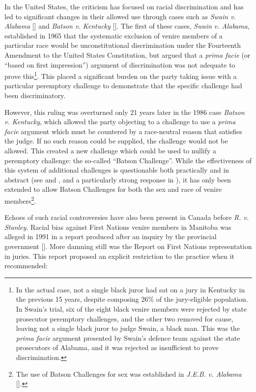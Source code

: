 In the United States, the criticism has focused on racial discrimination and has led to significant changes in their allowed use
through cases such as \textit{Swain v. Alabama} [\cite{swainvalabama}] and \textit{Batson v. Kentucky}
[\cite{batsonvkentucky}]. The first of these cases, \textit{Swain v. Alabama}, established in 1965 that the systematic exclusion
of venire members of a particular race would be unconstitutional discrimination under the Fourteenth Amendment to the United
States Constitution, but argued that a \textit{prima facie} (or ``based on first impression'') argument of discrimination was
not adequate to prove this\footnote{In the actual case, not a single
  black juror had sat on a jury in Kentucky in the previous 15 years,
  despite composing 26\% of the jury-eligible population. In Swain's trial, six of the eight black venire members were rejected by
  state prosecutor peremptory challenges, and the other two removed for cause, leaving not a single black juror to judge Swain, a
  black man. This was the \textit{prima facie} argument presented by Swain's defence team against the state prosecutors of Alabama, and it
  was rejected as insufficient to prove discrimination.}. This placed a significant burden on the party taking issue with a
particular peremptory challenge to demonstrate that the specific challenge had been discriminatory.

However, this ruling was overturned only 21 years later in the 1986 case \textit{Batson v. Kentucky}, which allowed the
party objecting to a challenge to use a \textit{prima facie} argument which must be countered by a race-neutral reason that
satisfies the judge. If no such reason could be supplied, the challenge would not be allowed. This created a new challenge which
could be used to nullify a peremptory challenge: the so-called ``Batson Challenge''. While the
effectiveness of this system of additional challenges is questionable both practically and in abstract (see \cite{page2005} and
\cite{morehead1994}, and a particularly strong response in \cite{hoffman1997}), it has only been extended to allow Batson
Challenges for both the sex and race of venire members\footnote{The use of Batson Challenges for sex was established in
  \textit{J.E.B. v. Alabama} [\cite{jebvalabama}].}.

Echoes of such racial controversies have also been present in Canada
before \textit{R. v. Stanley}. Racial bias against First Nations
venire members in Manitoba was alleged in 1991 in a report produced after an inquiry by the provincial government
[\cite{goodfirststep}]. More damning still was the \citeauthor{iacobuccireport} Report on First Nations representation in
juries. This report proposed an explicit restriction to the practice when it recommended:

